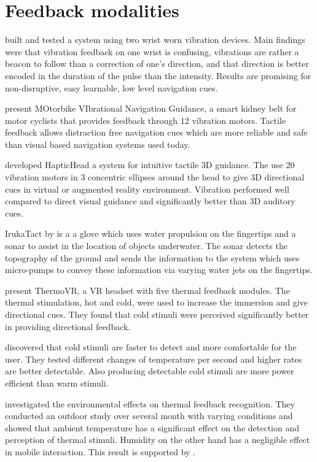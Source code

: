 \section{Feedback modalities}

\cite{bosman} built and tested a system using two wrist worn vibration devices.
Main findings were that vibration feedback on one wrist is confusing, vibrations are rather a beacon to follow than a correction of one's direction, and that direction is better encoded in the duration of the pulse than the intensity.
Results are promising for non-disruptive, easy learnable, low level navigation cues.

\cite{Kiss:2018:NSM:3173574.3174191} present MOtorbike VIbrational Navigation Guidance, a smart kidney belt for motor cyclists that provides feedback through 12 vibration motors.
Tactile feedback allows distraction free navigation cues which are more reliable and safe than visual based navigation systems used today.

\cite{Kaul_HapticHead} developed HapticHead a system for intuitive tactile 3D guidance.
The use 20 vibration motors in 3 concentric ellipses around the head to give 3D directional cues in virtual or augmented reality environment.
Vibration performed well compared to direct visual guidance and significantly better than 3D auditory cues.

IrukaTact by \cite{Chacin_Irukatact} is a a glove which uses water propulsion on the fingertips and a sonar to assist in the location of objects underwater. The sonar detects the topography of the ground and sends the information to the system which uses micro-pumps to convey these information via varying water jets on the fingertips.

\cite{Peiris_thermoVR} present ThermoVR, a VR headset with five thermal feedback modules. 
The thermal stimulation, hot and cold, were used to increase the immersion and give directional cues.
They found that cold stimuli were perceived significantly better in providing directional feedback.

\cite{Wilson:2011:LHT:1978942.1979316} discovered that cold stimuli are faster to detect and more comfortable for the user. 
They tested different changes of temperature per second and higher rates are better detectable. 
Also producing detectable cold stimuli are more power efficient than warm stimuli.

\cite{Halvey:2012:BCO:2207676.2207779} investigated the environmental effects on thermal feedback recognition. 
They conducted an outdoor study over several month with varying conditions and showed that ambient temperature has a significant effect on the detection and perception of thermal stimuli.
Humidity on the other hand has a negligible effect in mobile interaction. 
This result is supported by \cite{givoni}.


